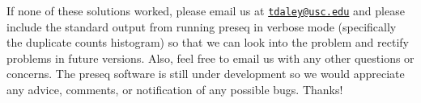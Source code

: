\documentclass[11pt, titlepage]{article}
\newcounter{question}
\begin{document}
\vspace{5mm}
If none of these solutions worked, please email us at 
\href{mailto:tdaley@usc.edu}{\nolinkurl{tdaley@usc.edu}}
and please include the standard output from running preseq in
verbose mode (specifically the duplicate counts histogram) so 
that we can look into the problem and rectify problems in future
versions.  Also, feel free to email us with any other questions or
concerns.
The preseq software is still under development so we would appreciate any 
advice, comments, or notification of any possible bugs. Thanks!

\newpage



\end{document}
